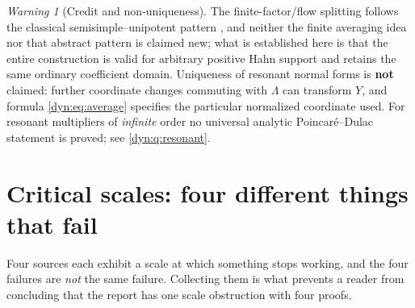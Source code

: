\documentclass[11pt,letterpaper]{article}
\theoremstyle{definition}
\theoremstyle{remark}
\newtheorem{warning}[warning]{Warning}
\numberwithin{equation}{section}
\begin{document}
\begin{warning}[Credit and non-uniqueness]\label{dyn:warn:finiteorder}
The finite-factor/flow splitting follows the classical
semisimple--unipotent pattern \cite{Ribon}, and neither the finite
averaging idea nor that abstract pattern is claimed new; what is
established here is that the entire construction is valid for arbitrary
positive Hahn support and retains the same ordinary coefficient domain.
Uniqueness of resonant normal forms is \textbf{not} claimed: further
coordinate changes commuting with $\Lambda$ can transform $Y$, and formula
\eqref{dyn:eq:average} specifies the particular normalized coordinate used.
For resonant multipliers of \emph{infinite} order no universal analytic
Poincar\'e--Dulac statement is proved; see \cref{dyn:q:resonant}.
\end{warning}

\section{Critical scales: four different things that fail}
\label{dyn:sec:scales}

Four sources each exhibit a scale at which something stops working, and the
four failures are \emph{not} the same failure. Collecting them is what
prevents a reader from concluding that the report has one scale obstruction
with four proofs.
\end{document}
